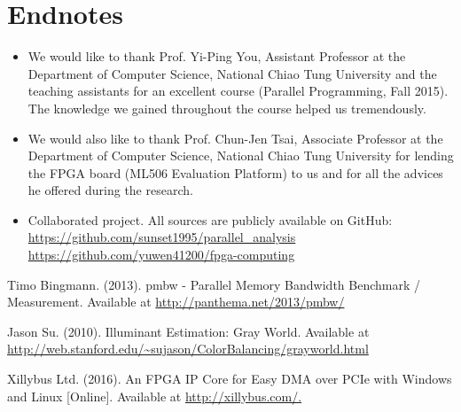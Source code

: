 \documentclass{acm_proc_article-sp}
\begin{document}
\section{Endnotes}
\begin{itemize}
\item We would like to thank Prof. Yi-Ping You, Assistant Professor at the Department of Computer Science, National Chiao Tung University and the teaching assistants for an excellent course (Parallel Programming, Fall 2015). The knowledge we gained throughout the course helped us tremendously.
\item We would also like to thank Prof. Chun-Jen Tsai, Associate Professor at the Department of Computer Science, National Chiao Tung University for lending the FPGA board (ML506 Evaluation Platform) to us and for all the advices he offered during the research.
\item Collaborated project. All sources are publicly available on GitHub: \\
\url{https://github.com/sunset1995/parallel_analysis} \\
\url{https://github.com/yuwen41200/fpga-computing}
\end{itemize}

\begin{thebibliography}{9}
Timo Bingmann. (2013).
pmbw - Parallel Memory Bandwidth Benchmark / Measurement.
Available at \url{http://panthema.net/2013/pmbw/}

Jason Su. (2010).
Illuminant Estimation: Gray World. 
Available at \url{http://web.stanford.edu/~sujason/ColorBalancing/grayworld.html}

Xillybus Ltd. (2016).
An FPGA IP Core for Easy DMA over PCIe with Windows and Linux [Online]. 
Available at \url{http://xillybus.com/.}
\end{thebibliography}
\end{document}
